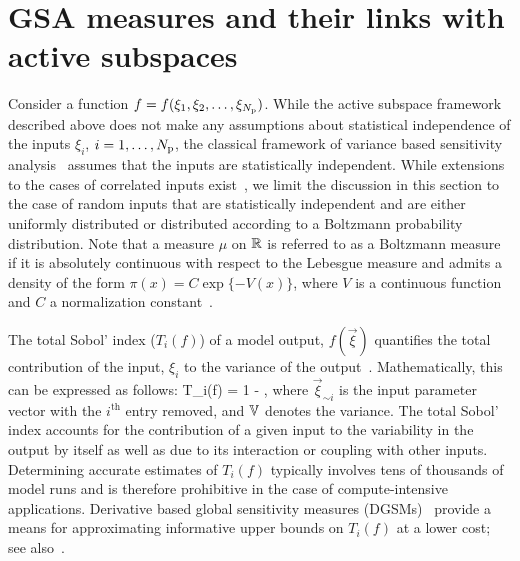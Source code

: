   

\section{GSA measures and their links with active subspaces}
\label{sub:gsa}
Consider a function $f = f(\xi_1, \xi_2, \ldots, \xi_{N_\text{p}})$. 
While the active subspace framework described above does not make any assumptions
about statistical independence of the inputs $\xi_i$, $i = 1, \ldots, {N_\text{p}}$, 
the classical 
framework of variance based sensitivity analysis~\cite{Sobol:2001, Saltelli:2010} 
assumes that the inputs
are statistically independent. While extensions to the cases 
of correlated inputs exist~\cite{Borgonovo:2007,Li:2010,Jacques:2006,Xu:2007,Hart:2017},
 we limit the discussion in this section to the
case of random inputs that are statistically independent and are 
either uniformly distributed or
distributed according to a Boltzmann probability distribution.
Note that a measure $\mu$
on $\mathbb{R}$ is referred to as a Boltzmann measure if it is 
absolutely continuous with respect to the Lebesgue measure  
and admits a density  of the form $\pi(x) = C \exp\{-V(x)\}$,
where $V$ is a continuous function and $C$ a normalization 
constant~\cite{Lamboni:2013}.


The total Sobol' index ($T_i(f)$) of a model output, $f(\vec\xi)$ quantifies
the total contribution of the input, $\xi_i$ to the variance of the
output~\cite{Sobol:2001}. Mathematically, this can be expressed as follows:
%
\be
T_i(f) = 1 - 
,
\label{eq:total}
\ee
%
where $\vec{\xi}_{\sim i}$ is the input parameter vector with the  
$i^\text{th}$ entry removed, and $\mathbb{V}$ denotes the variance. The total Sobol' index accounts
for the contribution of a given input to the variability in the output by itself
as well as due to its interaction or coupling with other inputs. 
Determining accurate estimates of $T_i(f)$ typically involves tens of
thousands of model runs and is therefore prohibitive in the case of
compute-intensive applications. Derivative based 
global sensitivity measures (DGSMs)~\cite{Sobol:2009} provide a means for
approximating informative upper bounds on $T_i(f)$ at a lower cost; see 
also~\cite{Vohra:2018}. 

